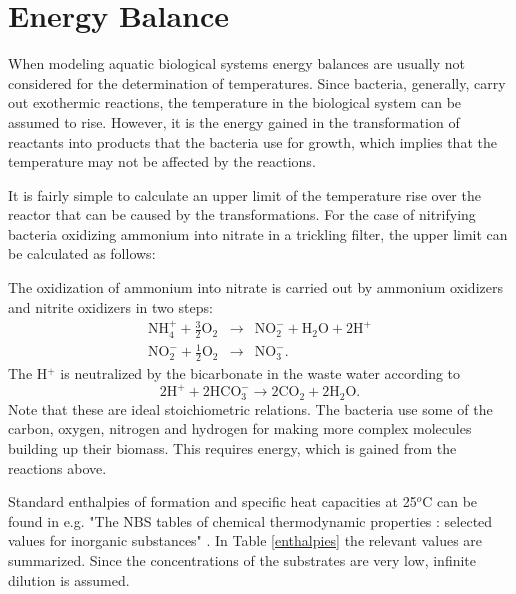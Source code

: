 \chapter{Energy Balance}\label{app:energy}

When modeling aquatic biological systems energy balances are usually not considered for the determination of temperatures. Since bacteria, generally, carry out exothermic reactions, the temperature in the biological system can be assumed to rise. However, it is the energy gained in the transformation of reactants into products that the bacteria use for growth, which implies that the temperature may not be affected by the reactions. 

It is fairly simple to calculate an upper limit of  the temperature rise over the reactor that can be caused by the transformations. For the  case of nitrifying bacteria oxidizing ammonium into nitrate in a trickling filter, the upper limit can be calculated as follows:


The oxidization of ammonium into nitrate is carried out by ammonium oxidizers and nitrite oxidizers in two steps:
\begin{eqnarray} 
\mbox{NH}_4^+ + \frac{3}{2}\mbox{O}_2 & \rightarrow & \mbox{NO}_2^- + \mbox{H}_2\mbox{O} + 2\mbox{H}^+ \label{nitrosomonas_oxidization} \\
\mbox{NO}_2^- + \frac{1}{2}\mbox{O}_2 & \rightarrow & \mbox{NO}_3^-.\label{nitrobacter_oxidization}
\end{eqnarray}
The H$^+$ is neutralized by the bicarbonate in the waste water according to
\begin{equation} \label{neutralization}
2\mbox{H}^+ + 2\mbox{HCO}_3^- \rightarrow 2\mbox{CO}_2 + 2\mbox{H}_2\mbox{O}.
\end{equation}
Note that these are ideal stoichiometric relations. The bacteria use some of the carbon, oxygen, nitrogen and hydrogen for making more complex molecules building up their biomass. This requires energy, which is gained from the reactions above. 

Standard enthalpies of formation and specific heat capacities at  25$^o$C can be found in e.g. "The NBS tables of chemical thermodynamic properties : selected values for inorganic substances" \cite{Wag:NBS:82}. In Table \ref{enthalpies} the relevant values are summarized. Since the concentrations of the substrates are very low, infinite dilution is assumed.

